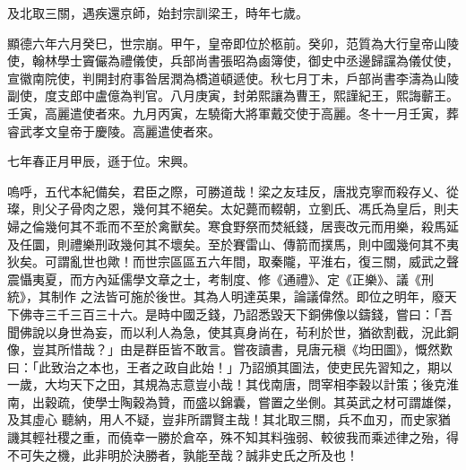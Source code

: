 \begin{pinyinscope}
 及北取三關，遇疾還京師，始封宗訓梁王，時年七歲。



 顯德六年六月癸巳，世宗崩。甲午，皇帝即位於柩前。癸卯，范質為大行皇帝山陵使，翰林學士竇儼為禮儀使，兵部尚書張昭為鹵簿使，御史中丞邊歸讜為儀仗使，
 宣徽南院使，判開封府事昝居潤為橋道頓遞使。秋七月丁未，戶部尚書李濤為山陵副使，度支郎中盧億為判官。八月庚寅，封弟熙讓為曹王，熙謹紀王，熙誨蘄王。壬寅，高麗遣使者來。九月丙寅，左驍衛大將軍戴交使于高麗。冬十一月壬寅，葬睿武孝文皇帝于慶陵。高麗遣使者來。



 七年春正月甲辰，遜于位。宋興。



 嗚呼，五代本紀備矣，君臣之際，可勝道哉！梁之友珪反，唐戕克寧而殺存乂、從璨，則父子骨肉之恩，幾何其不絕矣。太妃薨而輟朝，立劉氏、馮氏為皇后，則夫婦之倫幾何其不乖而不至於禽獸矣。寒食野祭而焚紙錢，居喪改元而用樂，殺馬延及任圜，則禮樂刑政幾何其不壞矣。至於賽雷山、傳箭而撲馬，則中國幾何其不夷狄矣。可謂亂世也歟！而世宗區區五六年間，取秦隴，平淮右，復三關，威武之聲震懾夷夏，而方內延儒學文章之士，考制度、修《通禮》、定《正樂》、議《刑統》，其制作
 之法皆可施於後世。其為人明達英果，論議偉然。即位之明年，廢天下佛寺三千三百三十六。是時中國乏錢，乃詔悉毀天下銅佛像以鑄錢，嘗曰：「吾聞佛說以身世為妄，而以利人為急，使其真身尚在，茍利於世，猶欲割截，況此銅像，豈其所惜哉？」由是群臣皆不敢言。嘗夜讀書，見唐元稹《均田圖》，慨然歎曰：「此致治之本也，王者之政自此始！」乃詔頒其圖法，使吏民先習知之，期以一歲，大均天下之田，其規為志意豈小哉！其伐南唐，問宰相李穀以計策；後克淮南，出穀疏，使學士陶穀為贊，而盛以錦囊，嘗置之坐側。其英武之材可謂雄傑，及其虛心
 聽納，用人不疑，豈非所謂賢主哉！其北取三關，兵不血刃，而史家猶譏其輕社稷之重，而僥幸一勝於倉卒，殊不知其料強弱、較彼我而乘述律之殆，得不可失之機，此非明於決勝者，孰能至哉？誠非史氏之所及也！



\end{pinyinscope}